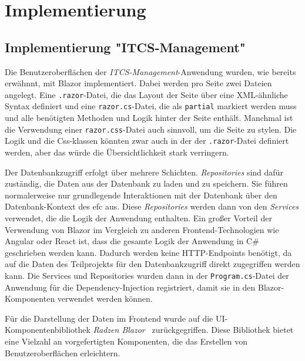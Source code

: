 \chapter{Implementierung}\label{ch:Implementierung}
\section{Implementierung "ITCS-Management"}\label{sec:ImplementierungITCS-Management}
    Die Benutzeroberflächen der \emph{ITCS-Management}-Anwendung wurden, wie bereits erwähnnt, mit Blazor implementiert. Dabei werden pro Seite 
    zwei Dateien angelegt. Eine \texttt{.razor}-Datei, die das Layout der Seite über eine XML-ähnliche Syntax definiert
    und eine \texttt{razor.cs}-Datei, die als \texttt{partial} markiert werden muss und alle benötigten Methoden und Logik hinter der Seite enthält. Manchmal ist die Verwendung einer \texttt{razor.css}-Datei 
    auch sinnvoll, um die Seite zu stylen. Die Logik und die Css-klassen könnten zwar auch in der der \texttt{.razor}-Datei definiert werden,
    aber das würde die Übersichtlichkeit stark verringern. 
    
    Der Datenbankzugriff erfolgt über mehrere Schichten. \emph{Repositories} sind dafür zuständig, 
    die Daten aus der Datenbank zu laden und zu speichern. Sie führen normalerweise nur grundlegende Interaktionen mit der Datenbank über den Datenbank-Kontext des \gls{efc} aus.
    Diese \emph{Repositories} werden dann von den \emph{Services} verwendet, die die Logik der Anwendung enthalten. Ein großer 
    Vorteil der Verwendung von Blazor im Vergleich zu anderen Frontend-Technologien wie Angular oder React ist, dass die gesamte Logik der Anwendung in
    C\# geschrieben werden kann. Dadurch werden keine HTTP-Endpoints benötigt, da auf die Daten des Teilprojekts für den Datenbankzugriff direkt zugegriffen werden kann.
    Die Services und Repositories wurden dann in der \texttt{Program.cs}-Datei der Anwendung für die Dependency-Injection registriert,
    damit sie in den Blazor-Komponenten verwendet werden können.

    Für die Darstellung der Daten im Frontend wurde auf die UI-Komponentenbibliothek \emph{Radzen Blazor}~\cite{radzen} zurückgegriffen. 
    Diese Bibliothek bietet eine Vielzahl an vorgefertigten Komponenten, die das Erstellen von Benutzeroberflächen erleichtern.
    
